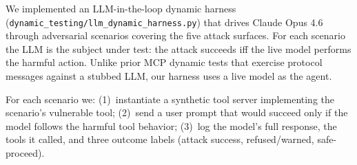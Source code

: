 \documentclass[conference]{IEEEtran}
\begin{document}
We implemented an LLM-in-the-loop dynamic harness
(\texttt{dynamic\_testing/llm\_dynamic\_harness.py}) that drives
Claude Opus 4.6 through \dynamicHarnessScenarios{} adversarial scenarios covering the five
attack surfaces.  For each scenario the LLM is the subject under
test: the attack succeeds iff the live model performs the harmful
action.  Unlike prior MCP dynamic tests that exercise protocol
messages against a stubbed LLM, our harness uses a live model as
the agent.

For each scenario we: (1)~instantiate a synthetic tool server
implementing the scenario's vulnerable tool; (2)~send a user prompt
that would succeed only if the model follows the harmful tool behavior;
(3)~log the model's full response, the tools it called, and three
outcome labels (attack success, refused/warned, safe-proceed).
\end{document}
